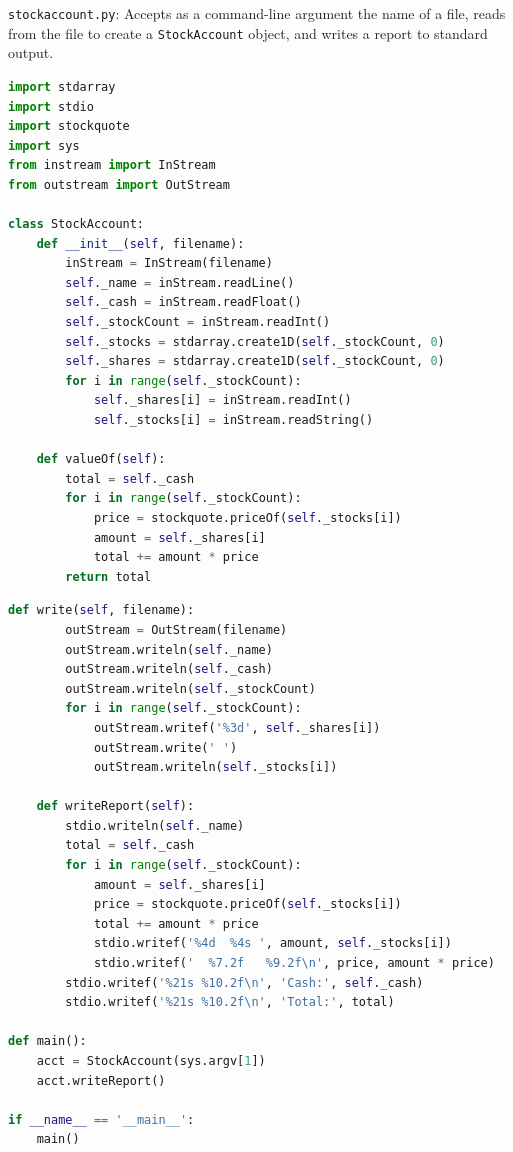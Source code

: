 \documentclass[8pt,a4paper,compress,handout]{beamer}
\begin{document}
\begin{frame}[fragile]
\begin{framed}
\tiny \lstinline{stockaccount.py}: Accepts as a command-line argument the name of a file, reads from the file to create a \lstinline{StockAccount} object, and writes a report to standard output.
\end{framed}

\begin{lstlisting}[language=Python]
import stdarray
import stdio
import stockquote
import sys
from instream import InStream
from outstream import OutStream

class StockAccount:
    def __init__(self, filename):
        inStream = InStream(filename)
        self._name = inStream.readLine()
        self._cash = inStream.readFloat()
        self._stockCount = inStream.readInt()
        self._stocks = stdarray.create1D(self._stockCount, 0)
        self._shares = stdarray.create1D(self._stockCount, 0)
        for i in range(self._stockCount):
            self._shares[i] = inStream.readInt()
            self._stocks[i] = inStream.readString()

    def valueOf(self):
        total = self._cash
        for i in range(self._stockCount):
            price = stockquote.priceOf(self._stocks[i])
            amount = self._shares[i]
            total += amount * price
        return total
\end{lstlisting}
\end{frame}

\begin{frame}[fragile]
\begin{lstlisting}[language=Python]
    def write(self, filename):
        outStream = OutStream(filename)
        outStream.writeln(self._name)
        outStream.writeln(self._cash)
        outStream.writeln(self._stockCount)
        for i in range(self._stockCount):
            outStream.writef('%3d', self._shares[i])
            outStream.write(' ')
            outStream.writeln(self._stocks[i])

    def writeReport(self):
        stdio.writeln(self._name)
        total = self._cash
        for i in range(self._stockCount):
            amount = self._shares[i]
            price = stockquote.priceOf(self._stocks[i])
            total += amount * price
            stdio.writef('%4d  %4s ', amount, self._stocks[i])
            stdio.writef('  %7.2f   %9.2f\n', price, amount * price)
        stdio.writef('%21s %10.2f\n', 'Cash:', self._cash)
        stdio.writef('%21s %10.2f\n', 'Total:', total)

def main():
    acct = StockAccount(sys.argv[1])
    acct.writeReport()

if __name__ == '__main__':
    main()
\end{lstlisting}
\end{frame}
\end{document}
